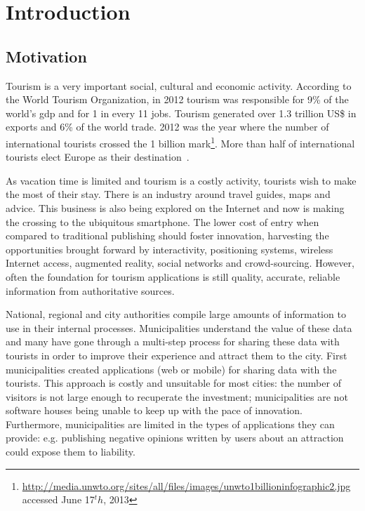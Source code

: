 \documentclass[times,doublespace]{ettauth}%
\begin{document}
\maketitle

\acresetall
\section{Introduction}

\subsection{Motivation}
\label{s:motivation}
Tourism is a very important social, cultural and economic activity.
According to the World Tourism Organization, in 2012 tourism was responsible for 9\% of the world's \ac{gdp} and for 1 in every 11 jobs.
Tourism generated over 1.3 trillion US\$ in exports and 6\% of the world trade.
2012 was the year where the number of international tourists crossed the 1 billion mark\footnote{\url{http://media.unwto.org/sites/all/files/images/unwto1billioninfographic2.jpg} accessed June 17$^th$, 2013}.
More than half of international tourists elect Europe as their destination~\cite{unwto}.

As vacation time is limited and tourism is a costly activity, tourists wish to make the most of their stay.
There is an industry around travel guides, maps and advice.
This business is also being explored on the Internet and now is making the crossing to the ubiquitous smartphone.
The lower cost of entry when compared to traditional publishing should foster innovation, harvesting the opportunities brought forward by interactivity, positioning systems, wireless Internet access, augmented reality, social networks and crowd-sourcing. 
However, often the foundation for tourism applications is still quality, accurate, reliable information from authoritative sources.

National, regional and city authorities compile large amounts of information to use in their internal processes.
Municipalities understand the value of these data and many have gone through a multi-step process for sharing these data with tourists in order to improve their experience and attract them to the city.
First municipalities created applications (web or mobile) for sharing data with the tourists.
This approach is costly and unsuitable for most cities: the number of visitors is not large enough to recuperate the investment; municipalities are not software houses being unable to keep up with the pace of innovation. 
Furthermore, municipalities are limited in the types of applications they can provide: e.g. publishing negative opinions written by users about an attraction could expose them to liability.
\end{document}
